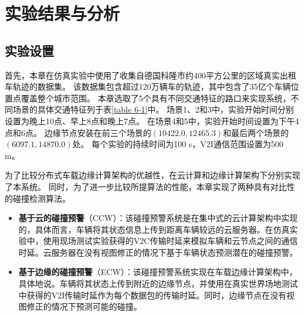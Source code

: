 \section{实验结果与分析}\label{section 6-4}

\subsection{实验设置}

首先，本章在仿真实验中使用了收集自德国科隆市约400平方公里的区域真实出租车轨迹的数据集\cite{uppoor2013generation}。
该数据集包含超过120万辆车的轨迹，其中包含了35亿个车辆位置点覆盖整个城市范围。
本章选取了5个具有不同交通特征的路口来实现系统，不同场景的具体交通特征列于表\ref{table 6-1}中。
场景1、2和3中，实验开始时间分别设置为晚上10点、早上8点和晚上7点。
在场景4和5中，实验开始时间设置为下午4点和6点。
边缘节点安装在前三个场景的$(10422.0, 12465.3)$和最后两个场景的$(6097.1, 14870.0)$处。
每个实验的持续时间为100 s，V2I通信范围设置为500 m。

\begin{table}[h]\small
\centering
{}
\label{table 6-1}
\end{table}

为了比较分布式车载边缘计算架构的优越性，在云计算和边缘计算架构下分别实现了本系统。
同时，为了进一步比较所提算法的性能，本章实现了两种具有对比性的碰撞检测算法。
\begin{itemize}
	\item \textbf{基于云的碰撞预警}（CCW）：该碰撞预警系统是在集中式的云计算架构中实现的，具体而言，车辆将其状态信息上传到距离车辆较远的云服务器。在仿真实验中，使用现场测试实验获得的V2C传输时延来模拟车辆和云节点之间的通信时延。云服务器在没有视图修正的情况下基于车辆状态预测潜在的碰撞预警。
	\item \textbf{基于边缘的碰撞预警}（ECW）：该碰撞预警系统实现在车载边缘计算架构中，具体地说。车辆将其状态上传到附近的边缘节点，并使用在真实世界场地测试中获得的V2I传输时延作为每个数据包的传输时延。同时，边缘节点在没有视图修正的情况下预测可能的碰撞。
\end{itemize}

